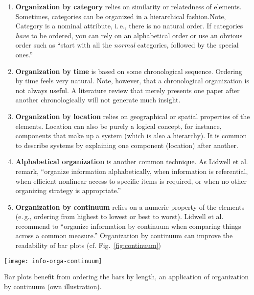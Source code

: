 \begin{enumerate}
\item \textbf{Organization by category} relies on similarity or relatedness of elements. Sometimes, categories can be organized in a hierarchical fashion.Note, Category is a nominal attribute, i.\,e., there is no natural order. If categories \emph{have} to be ordered, you can rely on an alphabetical order or use an obvious order such as ``start with all the \emph{normal} categories, followed by the special ones.''

\item \textbf{Organization by time} is based on some chronological sequence. Ordering by time feels very natural. Note, however, that a chronological organization is not always useful. A literature review that merely presents one paper after another chronologically will not generate much insight.

\item \textbf{Organization by location} relies on geographical or spatial properties of the elements. Location can also be purely a logical concept, for instance, components that make up a system (which is also a hierarchy). It is common to describe systems by explaining one component (location) after another.

\item \textbf{Alphabetical organization} is another common technique. As Lidwell et al. \cite{Lidwell10} remark, ``organize information alphabetically, when information is referential, when efficient nonlinear access to specific items is required, or when no other organizing strategy is appropriate.''

\item \textbf{Organization by continuum} relies on a numeric property of the elements (e.\,g., ordering from highest to lowest or best to worst). Lidwell et al. \cite{Lidwell10} recommend to ``organize information by continuum when comparing things across a common measure.'' Organization by continuum can improve the readability of bar plots (cf. Fig.~\ref{fig:continuum})
\end{enumerate}


\begin{marginfigure}
\centering
\texttt{[image: info-orga-continuum]}
\caption{\label{fig:continuum} Bar plots benefit from ordering the bars by length, an application of organization by continuum (own illustration).}%
\end{marginfigure}


